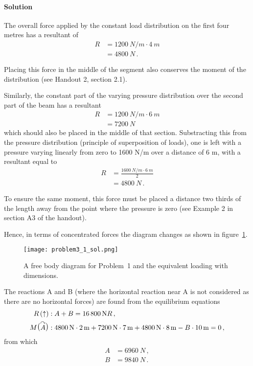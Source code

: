 \documentclass[a4paper,justified,oneside]{tufte-handout}
\numberwithin{equation}{subsection}
\begin{document}
\begin{solution}
\paragraph{Solution}
The overall force applied by the constant load distribution on the first four metres has a resultant of
\begin{align*}
	R 	&= \SI{1200}{N/m} \cdot \SI{4}{m}\\
	&= \SI{4800}{N}\,.
\end{align*}

Placing this force in the middle of the segment also conserves the moment of the distribution (see Handout 2, section 2.1).

Similarly, the constant part of the varying pressure distribution over the second part of
the beam has a resultant
\begin{align*}
	R 	&= \SI{1200}{N/m} \cdot \SI{6}{m}\\
	&= \SI{7200}{N}
\end{align*}
which should also be placed in the middle of that section. Substracting this from the pressure distribution (principle of superposition of loads), one is left with a pressure varying linearly from zero to 1600 N/m over a distance of 6 m, with a resultant equal to
\begin{align*}
	R 	&= \frac{\SI{1600}{N/m} \cdot \SI{6}{m}}{2}\\
	&= \SI{4800}{N}\,.
\end{align*}

To ensure the same moment, this force must be placed a distance two thirds of the length away from the point where the pressure is zero (see Example 2 in section A3 of the handout).

Hence, in terms of concentrated forces the diagram changes as shown in figure~\ref{A4:fig:Q1b}.
\begin{figure}
	\centering
	\texttt{[image: problem3\_1\_sol.png]}
	\caption{A free body diagram for Problem~1 and the equivalent loading with dimensions.}
	\label{A4:fig:Q1b}
\end{figure}

The reactions A and B (where the horizontal reaction near A is not considered as there are no horizontal forces) are found from the equilibrium equations
\begin{align*}
	R\left(\uparrow\right)															&: A+B	= \SI{16800}{N}R\,,\\
	M\raisebox{1.5pt}{\big(}\overset{\curvearrowright}{A}\raisebox{1.5pt}{\big)}	&: \SI{4800}{N}\cdot\SI{2}{m} +\SI{7200}{N}\cdot\SI{7}{m} +\SI{4800}{N}\cdot\SI{8}{m} - B\cdot\SI{10}{m} = 0\,,
\end{align*}
from which
\begin{align*}
	A&=\SI{6960}{N}\,,\\
	B&=\SI{9840}{N}\,.
\end{align*}
\clearpage
\end{solution}
\end{document}
